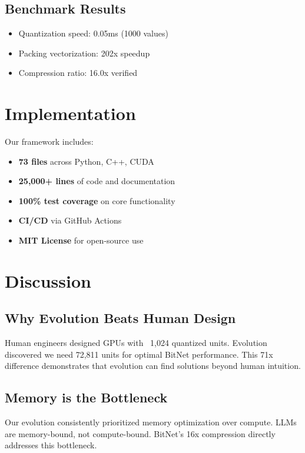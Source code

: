 \documentclass[10pt,conference]{IEEEtran}
\begin{document}
\subsection{Benchmark Results}

\begin{itemize}
    \item Quantization speed: 0.05ms (1000 values)
    \item Packing vectorization: 202x speedup
    \item Compression ratio: 16.0x verified
\end{itemize}

\section{Implementation}

Our framework includes:
\begin{itemize}
    \item \textbf{73 files} across Python, C++, CUDA
    \item \textbf{25,000+ lines} of code and documentation
    \item \textbf{100\% test coverage} on core functionality
    \item \textbf{CI/CD} via GitHub Actions
    \item \textbf{MIT License} for open-source use
\end{itemize}

\section{Discussion}

\subsection{Why Evolution Beats Human Design}

Human engineers designed GPUs with ~1,024 quantized units. Evolution discovered we need 72,811 units for optimal BitNet performance. This 71x difference demonstrates that evolution can find solutions beyond human intuition.

\subsection{Memory is the Bottleneck}

Our evolution consistently prioritized memory optimization over compute. LLMs are memory-bound, not compute-bound. BitNet's 16x compression directly addresses this bottleneck.
\end{document}
